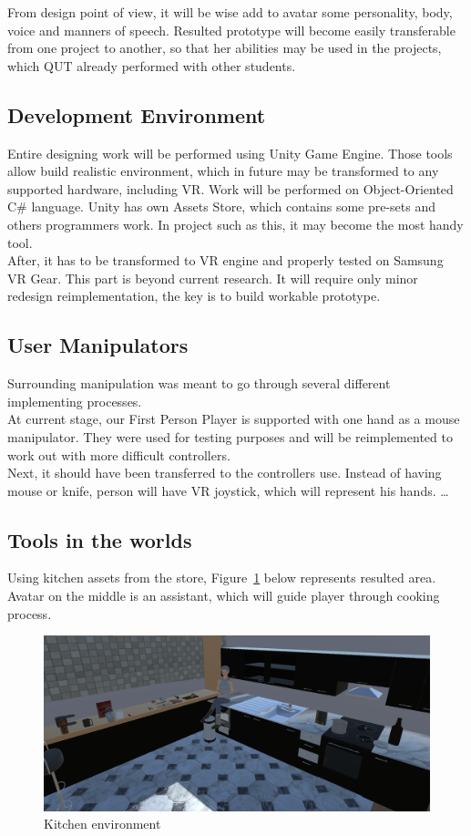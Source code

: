 \documentclass[18pt]{article}
\numberwithin{equation}{section} %
\numberwithin{figure}{section} %
\numberwithin{table}{section} %
\begin{document}
	From design point of view, it will be wise add to avatar some personality, body, voice and manners of speech. Resulted prototype will become easily transferable from one project to another, so that her abilities may be used in the projects, which QUT already performed with other students. \\
	
	\subsection{Development Environment}
	Entire designing work will be performed using Unity Game Engine. Those tools allow build realistic environment, which in future may be transformed to any supported hardware, including VR. Work will be performed on Object-Oriented C\# language. Unity has own Assets Store, which contains some pre-sets and others programmers work. In project such as this, it may become the most handy tool. \\
	
	After, it has to be transformed to VR engine and properly tested on Samsung VR Gear. This part is beyond current research. It will require only minor redesign reimplementation, the key is to build workable prototype. \\
	
	\subsection{User Manipulators}
	Surrounding manipulation was meant to go through several different implementing processes.\\	
	At current stage, our First Person Player is supported with one hand as a mouse manipulator. They were used for testing purposes and will be reimplemented to work out with more difficult controllers. \\
	
	Next, it should have been transferred to the controllers use. Instead of having mouse or knife, person will have VR joystick, which will represent his hands. \ldots \\
	
	
	
	\subsection{Tools in the worlds}
	Using kitchen assets from the store, Figure~\ref{fig:kitchen} below represents resulted area. Avatar on the middle is an assistant, which will guide player through cooking process. 
	\begin{figure}[H]
		\centering
		\includegraphics[width=0.7\linewidth]{images/kitchen}
		\caption{Kitchen environment}
		\label{fig:kitchen}
	\end{figure}
	
\end{document}
